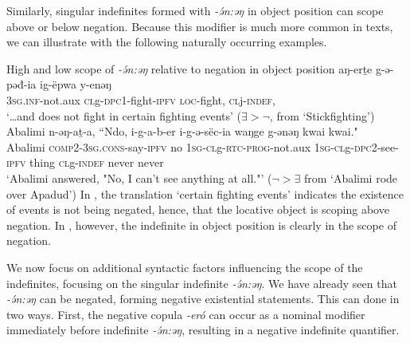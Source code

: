 Similarly, singular indefinites formed with \textit{-ə́n:əŋ} in object position can scope above or below negation. Because this modifier is much more common in texts, we can illustrate with the following naturally occurring examples.

\ea High and low scope of \textit{-ə́n:əŋ} relative to negation in object position \label{ex:ch8:objindefhilo}
	\ea  \gll  aŋ-erṯe g-ə-pəđ-ia  			ig-ëpwa 	y-enəŋ \\
			\textsc{3sg.inf}-not.aux  \textsc{cl}g-\textsc{dpc1}-fight-\textsc{ipfv} \textsc{loc}-fight, \textsc{cl}j-\textsc{indef}, \\
		\glt `\ldots and does not fight in certain fighting events' \hfill ($\exists>\neg$, from `Stickfighting')  \label{ex:ch8:stick1}
	\ex \gll  Abalimi  n-ǝŋ-aṯ-a, ``Ndo, i-g-a-b-er i-g-ǝ-sëc-ia	 waŋge 	g-ǝnǝŋ kwai kwai." \\
			 Abalimi \textsc{comp2}-\textsc{3sg.cons}-say-\textsc{ipfv} no 1\textsc{sg}-\textsc{cl}g-\textsc{rtc-prog}-not.aux 1\textsc{sg}-\textsc{cl}g-\textsc{dpc2}-see-\textsc{ipfv} thing \textsc{cl}g-\textsc{indef} never never \\
		\glt `Abalimi answered, "No, I can’t see anything at all."' \hfill ($\neg > \exists$ from `Abalimi rode over Apadud') \label{ex:ch8:no}
	\z 
\z 
In , the translation `certain fighting events' indicates the existence of events is not being negated, hence, that the locative object is scoping above negation. In , however, the indefinite in object position is clearly in the scope of negation.

We now focus on additional syntactic factors influencing the scope of the indefinites, focusing on the singular indefinite \textit{-ə́n:əŋ}. We have already seen that \textit{-ə́n:əŋ} can be negated, forming negative existential statements. This can done in two ways. First, the negative copula \textit{-eró} can occur as a nominal modifier immediately before indefinite \textit{-ə́n:əŋ}, resulting in a negative indefinite quantifier.

